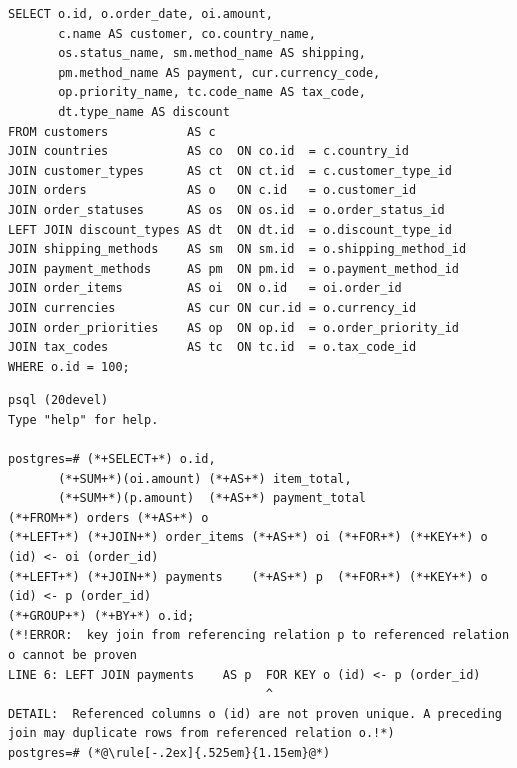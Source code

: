 \documentclass[12pt]{article}
\newcommand{\FanoutCheckHeight}[3]{%
  \ifdim\dimexpr\ht#1+\dp#1\relax>#2\relax
    \PackageError{fanout-layout}{#3 exceeds its vertical allocation}%
      {Adjust the terminal line spacing or the box position.}%
  \fi
}
\begin{document}
\begin{lrbox}{\complexOn}\begin{minipage}{344mm}
\begin{NoHyper}
\begin{lstlisting}[style=complex-sql]
SELECT o.id, o.order_date, oi.amount,
       c.name AS customer, co.country_name,
       os.status_name, sm.method_name AS shipping,
       pm.method_name AS payment, cur.currency_code,
       op.priority_name, tc.code_name AS tax_code,
       dt.type_name AS discount
FROM customers           AS c
JOIN countries           AS co  ON co.id  = c.country_id
JOIN customer_types      AS ct  ON ct.id  = c.customer_type_id
JOIN orders              AS o   ON c.id   = o.customer_id
JOIN order_statuses      AS os  ON os.id  = o.order_status_id
LEFT JOIN discount_types AS dt  ON dt.id  = o.discount_type_id
JOIN shipping_methods    AS sm  ON sm.id  = o.shipping_method_id
JOIN payment_methods     AS pm  ON pm.id  = o.payment_method_id
JOIN order_items         AS oi  ON o.id   = oi.order_id
JOIN currencies          AS cur ON cur.id = o.currency_id
JOIN order_priorities    AS op  ON op.id  = o.order_priority_id
JOIN tax_codes           AS tc  ON tc.id  = o.tax_code_id
WHERE o.id = 100;
\end{lstlisting}
\end{NoHyper}
\end{minipage}\end{lrbox}

\begin{lrbox}{\fanoutTerminal}\begin{minipage}{364mm}
\begin{lstlisting}[style=terminal-session,
  moredelim={**[is][\bfseries\color{red!80!black}]{(*!}{!*)}},
  moredelim={**[is][\color{blue}]{(*+}{+*)}}]
% psql postgres
psql (20devel)
Type "help" for help.

postgres=# (*+SELECT+*) o.id,
       (*+SUM+*)(oi.amount) (*+AS+*) item_total,
       (*+SUM+*)(p.amount)  (*+AS+*) payment_total
(*+FROM+*) orders (*+AS+*) o
(*+LEFT+*) (*+JOIN+*) order_items (*+AS+*) oi (*+FOR+*) (*+KEY+*) o (id) <- oi (order_id)
(*+LEFT+*) (*+JOIN+*) payments    (*+AS+*) p  (*+FOR+*) (*+KEY+*) o (id) <- p (order_id)
(*+GROUP+*) (*+BY+*) o.id;
(*!ERROR:  key join from referencing relation p to referenced relation o cannot be proven
LINE 6: LEFT JOIN payments    AS p  FOR KEY o (id) <- p (order_id)
                                    ^
DETAIL:  Referenced columns o (id) are not proven unique. A preceding join may duplicate rows from referenced relation o.!*)
postgres=# (*@\rule[-.2ex]{.525em}{1.15em}@*)
\end{lstlisting}
\end{minipage}\end{lrbox}
\FanoutCheckHeight{\openingFanout}{78mm}{Opening ON query}
\FanoutCheckHeight{\complexOn}{122mm}{Complex ON query}
\FanoutCheckHeight{\fanoutTerminal}{125mm}{Fanout psql session}
\end{document}
